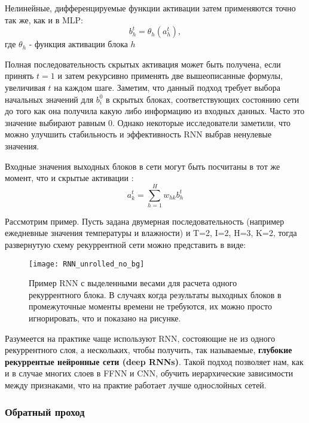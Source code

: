 Нелинейные, дифференцируемые функции активации затем применяются точно так же, как 
и в MLP:
\begin{equation*}
    b_h^t = \theta_h (a_h^t),
\end{equation*}
где $\theta_h$ - функция активации блока $h$

Полная последовательность скрытых активация может быть получена, если принять 
$t=1$ и затем рекурсивно применять две вышеописанные формулы, увеличивая $t$ 
на каждом шаге. Заметим, что данный подход требует выбора начальных значений 
для $b_i^0$ в скрытых блоках, соответствующих состоянию сети до того как 
она получила какую либо информацию из входных данных. Часто это значение 
выбирают равным 0. Однако некоторые исследователи заметили, что можно улучшить 
стабильность и эффективность RNN выбрав ненулевые значения.

Входные значения выходных блоков в сети могут быть посчитаны в тот же момент, что 
и скрытые активации \cite{graves}:
\begin{equation*}
    a_k^t = \sum_{h=1}^H w_{hk} b_h^t
\end{equation*}

\newpage

Рассмотрим пример. Пусть задана двумерная последовательность 
(например ежедневные значения температуры и влажности) и T=2, I=2, H=3, K=2, 
тогда развернутую схему рекуррентной сети можно представить в виде:
\begin{figure}[h!]
    \centering
    \texttt{[image: RNN\_unrolled\_no\_bg]}
    \caption{Пример RNN с выделенными весами для 
    расчета одного рекуррентного блока. В случаях когда результаты 
    выходных блоков в промежуточные моменты времени не требуются, их 
    можно просто игнорировать, что и показано на рисунке.}
    \label{fig:RNN_unrolled}
\end{figure}

Разумеется на практике чаще используют RNN, состояющие не из одного 
рекуррентного слоя, а нескольких, чтобы получить, так называемые, 
\textbf{глубокие рекуррентые нейронные сети (deep RNNs)}. Такой подход 
позволяет нам, как и в случае многих слоев в FFNN и CNN, 
обучить иерархические зависимости между признаками, что на практие 
работает лучше однослойных сетей. 

\subsubsection{Обратный проход}

